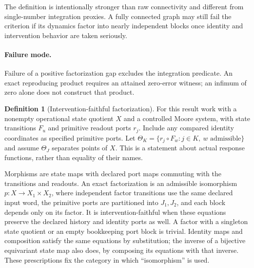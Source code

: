 \documentclass[11pt,a4paper]{article}
\theoremstyle{definition}
\newtheorem{definition}[theorem]{Definition}
\begin{document}
The definition is intentionally stronger than raw connectivity and different from single-number integration proxies. A fully connected graph may still fail the criterion if its dynamics factor into nearly independent blocks once identity and intervention behavior are taken seriously.

\paragraph{Failure mode.}
Failure of a positive factorization gap excludes the integration predicate. An exact reproducing product requires an attained zero-error witness; an infimum of zero alone does not construct that product.

\begin{definition}[Intervention-faithful factorization]\label{def:intervention-faithful-factorization}
For this result work with a nonempty operational state quotient $X$ and a
controlled Moore system, with state transitions $F_u$ and primitive readout
ports $r_j$. Include any compared identity coordinates as specified primitive
ports. Let $\Theta_K=\{r_j\circ F_w:j\in K,\ w\text{ admissible}\}$ and
assume $\Theta_J$ separates points of $X$. This is a statement about actual
response functions, rather than equality of their names.

Morphisms are state maps with declared port maps commuting with the transitions
and readouts. An exact factorization is an admissible isomorphism
$p:X\to X_1\times X_2$, where independent factor transitions use the same
declared input word, the primitive ports are partitioned into $J_1,J_2$, and
each block depends only on its factor. It is intervention-faithful when these
equations preserve the declared history and identity ports as well. A factor
with a singleton state quotient or an empty bookkeeping port block is trivial.
Identity maps and composition satisfy the same equations by substitution;
the inverse of a bijective equivariant state map also does, by composing
its equations with that inverse. These prescriptions fix the category in
which ``isomorphism'' is used.
\end{definition}
\end{document}
